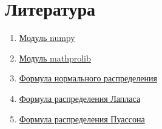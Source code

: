 \documentclass[a4]{article}
\begin{document}
\section{Литература}
\begin{enumerate}
\item  \href{https://physics.susu.ru/vorontsov/language/numpy.html}{Модуль numpy}
\item  \href{https://matplotlib.org/users/}{Модуль mathprolib}
\item  \href{https://ru.wikipedia.org/wiki/%D0%9D%D0%BE%D1%80%D0%BC%D0%B0%D0%BB%D1%8C%D0%BD%D0%BE%D0%B5_%D1%80%D0%B0%D1%81%D0%BF%D1%80%D0%B5%D0%B4%D0%B5%D0%BB%D0%B5%D0%BD%D0%B8%D0%B5}{Формула нормального распределения}
\item  \href{https://ru.wikipedia.org/wiki/Распределение_Лапласа}{Формула распределения Лапласа}
\item  \href{https://ru.wikipedia.org/wiki/%D0%A0%D0%B0%D1%81%D0%BF%D1%80%D0%B5%D0%B4%D0%B5%D0%BB%D0%B5%D0%BD%D0%B8%D0%B5_%D0%9F%D1%83%D0%B0%D1%81%D1%81%D0%BE%D0%BD%D0%B0}{Формула распределения Пуассона}
\end{enumerate}
\end{document}
